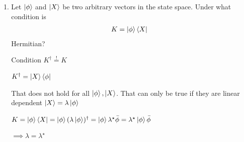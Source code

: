 \documentclass[11pt,a4paper]{scrartcl}
\begin{document}
\begin{enumerate}
\begin{calculationbox}
            \begin{calculationbox}
                $\ket{\phi} = \begin{pmatrix}
                    \frac{1}{4} \\ 0 \\ \frac{1}{3}
                \end{pmatrix}$, 
                $\bra{\phi} = \begin{pmatrix}
                    \frac{1}{4} & 0 & \frac{1}{3}
                \end{pmatrix}$

                $P_\phi 
                = \ket{\phi} \bra{\phi}
                = \begin{pmatrix}
                    \frac{1}{16} & 0 & \frac{1}{12}\\
                    0 & 0 & 0 \\
                    \frac{1}{12} & 0 & \frac{1}{9}
                \end{pmatrix}
                $
                
            \end{calculationbox}
        \end{calculationbox}

        \item Let $\ket{\phi}$ and $\ket{X}$ be two arbitrary vectors in the state space. Under what condition is 
        \begin{align*}
            K = \ket{\phi} \bra{X}
        \end{align*}
        Hermitian?

        \begin{calculationbox}
            Condition $K^\dagger \stackrel{!}{=} K$
            \begin{calculationbox}
                $K^\dagger = \ket{X} \bra{\phi}$
            \end{calculationbox}
            That does not hold for all $\ket{\phi}, \ket{X}$. That can only be true if they are linear dependent $\ket{X} = \lambda \ket{\phi}$

            \begin{calculationbox}
                $K = \ket{\phi} \bra{X} = \ket{\phi} (\lambda \ket{\phi})^\dagger = \ket{\phi} \lambda^\star \bar{\phi} = \lambda^\star \ket{\phi} \bar{\phi}$
            \end{calculationbox}
            $\implies \lambda = \lambda^\star$
        \end{calculationbox}


\end{enumerate}
\end{document}
